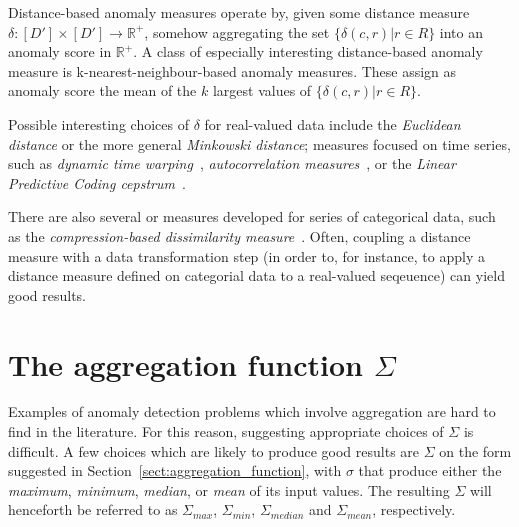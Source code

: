 Distance-based anomaly measures operate by, given some distance measure $\delta: [D'] \times [D'] \rightarrow \mathbb{R}^+$, somehow aggregating the set $\{\delta(c, r) | r \in R\}$ into an anomaly score in $\mathbb{R}^+$. A class of especially interesting distance-based anomaly measure is k-nearest-neighbour-based anomaly measures. These assign as anomaly score the mean of the $k$ largest values of $\{\delta(c, r) | r \in R\}$.

Possible interesting choices of $\delta$ for real-valued data include the \emph{Euclidean distance} or the more general \emph{Minkowski distance}; measures focused on time series, such as \emph{dynamic time warping}~\cite{dtw}, \emph{autocorrelation measures}~\cite{autocorrelation}, or the \emph{Linear Predictive Coding cepstrum}~\cite{cepstrum}.

There are also several or measures developed for series of categorical data, such as the \emph{compression-based dissimilarity measure}~\cite{keogh2}. Often, coupling a distance measure with a data transformation step (in order to, for instance, to apply a distance measure defined on categorial data to a real-valued seqeuence) can yield good results.

\section{The aggregation function \texorpdfstring{$\Sigma$}{Sigma}}
\label{sect:aggregation_function_2}

Examples of anomaly detection problems which involve aggregation are hard to find in the literature. For this reason, suggesting appropriate choices of $\Sigma$ is difficult. A few choices which are likely to produce good results are $\Sigma$ on the form suggested in Section~\ref{sect:aggregation_function}, with $\sigma$ that produce either the \emph{maximum}, \emph{minimum}, \emph{median}, or \emph{mean} of its input values. The resulting $\Sigma$ will henceforth be referred to as $\Sigma_{max}$, $\Sigma_{min}$, $\Sigma_{median}$ and $\Sigma_{mean}$, respectively.
